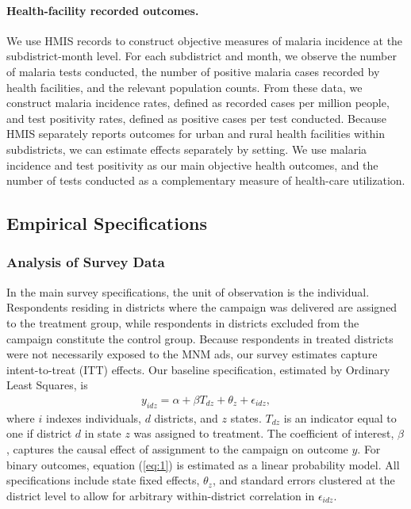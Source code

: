 \paragraph{Health-facility recorded outcomes.}
We use HMIS records to construct objective measures of malaria incidence at the subdistrict-month level. For each subdistrict and month, we observe the number of malaria tests conducted, the number of positive malaria cases recorded by health facilities, and the relevant population counts. From these data, we construct malaria incidence rates, defined as recorded cases per million people, and test positivity rates, defined as positive cases per test conducted. Because HMIS separately reports outcomes for urban and rural health facilities within subdistricts, we can estimate effects separately by setting. We use malaria incidence and test positivity as our main objective health outcomes, and the number of tests conducted as a complementary measure of health-care utilization.




\subsection{Empirical Specifications}
\subsubsection{Analysis of Survey Data}

In the main survey specifications, the unit of observation is the individual. Respondents residing in districts where the campaign was delivered are assigned to the treatment group, while respondents in districts excluded from the campaign constitute the control group. Because respondents in treated districts were not necessarily exposed to the MNM ads, our survey estimates capture intent-to-treat (ITT) effects. Our baseline specification, estimated by Ordinary Least Squares, is
\begin{align} \label{eq:1}
y_{idz} = \alpha + \beta T_{dz} + \theta_z + \epsilon_{idz},
\end{align}
where $i$ indexes individuals, $d$ districts, and $z$ states. $T_{dz}$ is an indicator equal to one if district $d$ in state $z$ was assigned to treatment. The coefficient of interest, $\beta$, captures the causal effect of assignment to the campaign on outcome $y$. For binary outcomes, equation (\ref{eq:1}) is estimated as a linear probability model. All specifications include state fixed effects, $\theta_z$, and standard errors clustered at the district level to allow for arbitrary within-district correlation in $\epsilon_{idz}$.

